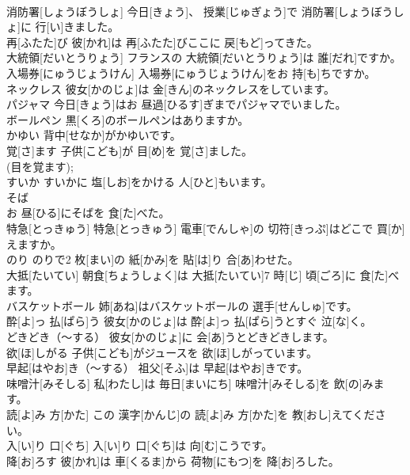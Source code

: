 \documentclass[8pt]{extreport}
\begin{document}
\begin{CJK}{UTF8}{min}
\\	消防署[しょうぼうしょ]	今日[きょう]、 授業[じゅぎょう]で 消防署[しょうぼうしょ]に 行[い]きました。		
\\	再[ふたた]び	彼[かれ]は 再[ふたた]びここに 戻[もど]ってきた。		
\\	大統領[だいとうりょう]	フランスの 大統領[だいとうりょう]は 誰[だれ]ですか。		
\\	入場券[にゅうじょうけん]	入場券[にゅうじょうけん]をお 持[も]ちですか。		
\\	ネックレス	彼女[かのじょ]は 金[きん]のネックレスをしています。		
\\	パジャマ	今日[きょう]はお 昼過[ひるす]ぎまでパジャマでいました。		
\\	ボールペン	黒[くろ]のボールペンはありますか。		
\\	かゆい	背中[せなか]がかゆいです。		
\\	覚[さ]ます	子供[こども]が 目[め]を 覚[さ]ました。		
\\	(目を覚ます); 
\\	すいか	すいかに 塩[しお]をかける 人[ひと]もいます。		
\\	そば 
\\	お 昼[ひる]にそばを 食[た]べた。		
\\	特急[とっきゅう]	特急[とっきゅう] 電車[でんしゃ]の 切符[きっぷ]はどこで 買[か]えますか。		
\\	のり	のりで2 枚[まい]の 紙[かみ]を 貼[は]り 合[あ]わせた。		
\\	大抵[たいてい]	朝食[ちょうしょく]は 大抵[たいてい]7 時[じ] 頃[ごろ]に 食[た]べます。		
\\	バスケットボール	姉[あね]はバスケットボールの 選手[せんしゅ]です。		
\\	酔[よ]っ 払[ぱら]う	彼女[かのじょ]は 酔[よ]っ 払[ぱら]うとすぐ 泣[な]く。		
\\	どきどき（～する）	彼女[かのじょ]に 会[あ]うとどきどきします。		
\\	欲[ほ]しがる	子供[こども]がジュースを 欲[ほ]しがっています。		
\\	早起[はやお]き（～する）	祖父[そふ]は 早起[はやお]きです。		
\\	味噌汁[みそしる]	私[わたし]は 毎日[まいにち] 味噌汁[みそしる]を 飲[の]みます。		
\\	読[よ]み 方[かた]	この 漢字[かんじ]の 読[よ]み 方[かた]を 教[おし]えてください。		
\\	入[い]り 口[ぐち]	入[い]り 口[ぐち]は 向[む]こうです。		
\\	降[お]ろす	彼[かれ]は 車[くるま]から 荷物[にもつ]を 降[お]ろした。		

\end{CJK}
\end{document}
